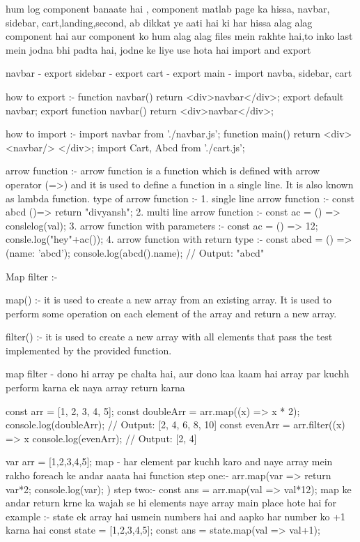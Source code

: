 hum log component banaate hai , component matlab page ka hissa, navbar, sidebar, cart,landing,second, ab dikkat ye aati hai ki har hissa alag alag component hai aur component ko hum alag alag files mein rakhte hai,to inko last mein jodna bhi padta hai, jodne ke liye use hota hai import and export

navbar - export 
sidebar - export
cart - export
main - import navba, sidebar, cart 

how to export :- 
function navbar(){
    return <div>navbar</div>;
}
export default navbar;
export function navbar(){
    return <div>navbar</div>;
}

how to import :- 
import navbar from './navbar.js';
function main(){
    return <div>
    <navbar/>
    </div>;
    }
import {Cart, Abcd} from
'./cart.js';

arrow function :-
arrow function is a function which is defined with arrow operator (=>) and it is used to define
a function in a single line. It is also known as lambda function.
type of arrow function :- 
1. single line arrow function :-
const abcd ()=>{
    return "divyansh";
}
2. multi line arrow function :-
const ac = () =>{
    conslelog(val);
}
3. arrow function with parameters :-
const ac = () => 12;
consle.log("hey"+ac());
4. arrow function with return type :-
const abcd = () => ({name: 'abcd'});
console.log(abcd().name); // Output: "abcd"

Map filter :-

map() :- it is used to create a new array from an existing array. It is used to
perform some operation on each element of the array and return a new array.

filter() :- it is used to create a new array with all elements that pass the test implemented by
the provided function.

map filter - dono hi array pe chalta hai, aur dono kaa kaam hai array par kuchh perform karna ek naya array return karna 

const arr = [1, 2, 3, 4, 5];
const doubleArr = arr.map((x) => x * 2);
console.log(doubleArr); // Output: [2, 4, 6, 8,
10]
const evenArr = arr.filter((x) => x %
console.log(evenArr); // Output: [2, 4]

var arr = [1,2,3,4,5];
map - har element par kuchh karo and naye array mein rakho 
foreach ke andar aaata hai function 
step one:- 
arr.map(var => {
    return var*2;
    console.log(var);
})
step two:-
const ans = arr.map(val => val*12);
map ke andar return krne ka wajah se hi elements naye array main place hote hai 
for example :- 
state ek array hai usmein numbers hai and aapko har number ko +1 karna hai 
const state = [1,2,3,4,5];
const ans = state.map(val => val+1);

